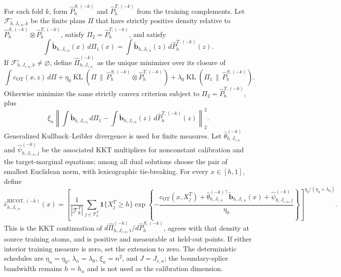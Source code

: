 For each fold \(k\), form \(\widehat P^{S,(-k)}_h\) and \(\widehat P^{T,(-k)}_h\) from the training complements. Let \(\mathcal F^\circ_{h,J_{r,n},k}\) be the finite plans \(\Pi\) that have strictly positive density relative to \(\widehat P^{S,(-k)}_h\otimes\widehat P^{T,(-k)}_h\), satisfy \(\Pi_2=\widehat P^{T,(-k)}_h\), and satisfy
\[
\int\widetilde{\mathbf b}_{h,J_{r,n}}(x)\,d\Pi_1(x)=\int\widetilde{\mathbf b}_{h,J_{r,n}}(z)\,d\widehat P^{T,(-k)}_h(z).
\]
If \(\mathcal F^\circ_{h,J_{r,n},k}\ne\varnothing\), define \(\widehat\Pi^{(-k)}_{h,J_{r,n}}\) as the unique minimizer over its closure of
\[
\int c_{\mathrm{OT}}(x,z)\,d\Pi+\eta_0\operatorname{KL}(\Pi\,\|\,\widehat P^{S,(-k)}_h\otimes\widehat P^{T,(-k)}_h)+\lambda_0\operatorname{KL}(\Pi_1\,\|\,\widehat P^{S,(-k)}_h).
\]
Otherwise minimize the same strictly convex criterion subject to \(\Pi_2=\widehat P^{T,(-k)}_h\), plus
\[
\xi_n\left\|\int\widetilde{\mathbf b}_{h,J_{r,n}}\,d\Pi_1-\int\widetilde{\mathbf b}_{h,J_{r,n}}(z)\,d\widehat P^{T,(-k)}_h(z)\right\|_2^2.
\]
Generalized Kullback--Leibler divergence is used for finite measures. Let \(\widehat\theta^{(-k)}_{h,J_{r,n}}\) and \(\widehat\psi^{(-k)}_{h,J_{r,n},j}\) be the associated KKT multipliers for nonconstant calibration and the target-marginal equations; among all dual solutions choose the pair of smallest Euclidean norm, with lexicographic tie-breaking. For every \(x\in[h,1]\), define
\[
\widehat r^{\mathrm{RICOT},(-k)}_{h,J_{r,n}}(x)=\left[\frac1{|\mathcal T^T_k|}\sum_{j\in\mathcal T^T_k}\mathbf 1\{X_j^T\ge h\}\exp\left\{-\frac{c_{\mathrm{OT}}(x,X_j^T)+\widehat\theta_{h,J_{r,n}}^{(-k)\top}\widetilde{\mathbf b}_{h,J_{r,n}}(x)+\widehat\psi^{(-k)}_{h,J_{r,n},j}}{\eta_0}\right\}\right]^{\eta_0/(\eta_0+\lambda_0)}.
\]
This is the KKT continuation of \(d\widehat\Pi^{(-k)}_{h,J_{r,n},1}/d\widehat P^{S,(-k)}_h\), agrees with that density at source training atoms, and is positive and measurable at held-out points. If either interior training measure is zero, set the extension to zero. The deterministic schedules are \(\eta_n=\eta_0\), \(\lambda_n=\lambda_0\), \(\xi_n=n^2\), and \(J=J_{r,n}\); the boundary-splice bandwidth remains \(h=h_n\) and is not used as the calibration dimension.
